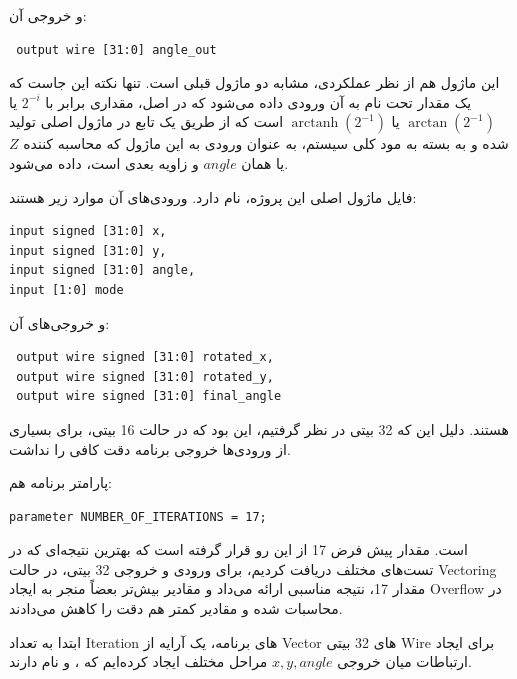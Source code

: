 \documentclass[12pt,titlepage,a4page , tikz , multi,table , svgnames,xcdraw]{article}
\DeclareMathOperator\arctanh{arctanh}
\begin{document}
و خروجی آن:

\begin{latin}
\begin{verbatim}
 output wire [31:0] angle_out
\end{verbatim}
\end{latin}

این ماژول هم از نظر عملکردی، مشابه دو ماژول قبلی است. تنها نکته این جاست که یک مقدار تحت نام  به آن ورودی داده می‌شود که در اصل، مقداری برابر با $2^{-i}$ یا $\arctan (2^{-1})$ یا
$\arctanh (2^{-1})$
است که از طریق یک تابع در ماژول اصلی تولید شده و به بسته به مود کلی سیستم، به عنوان ورودی به این ماژول که محاسبه کننده $Z$ یا همان $angle$ و زاویه بعدی است، داده می‌شود.

\hrulefill

فایل ماژول اصلی این پروژه،  نام دارد. ورودی‌های آن موارد زیر هستند:

\begin{latin}
\begin{verbatim}
input signed [31:0] x,
input signed [31:0] y,
input signed [31:0] angle,
input [1:0] mode
\end{verbatim}
\end{latin}

و خروجی‌های آن:

\begin{latin}
\begin{verbatim}
 output wire signed [31:0] rotated_x,
 output wire signed [31:0] rotated_y,
 output wire signed [31:0] final_angle
\end{verbatim}
\end{latin}

هستند. دلیل این که 32 بیتی در نظر گرفتیم، این بود که در حالت 16 بیتی، برای بسیاری از ورودی‌ها خروجی برنامه دقت کافی را نداشت.

پارامتر برنامه هم:

\begin{latin}
\begin{verbatim}
parameter NUMBER_OF_ITERATIONS = 17;
\end{verbatim}
\end{latin}

است. مقدار پیش فرض 17 از این رو قرار گرفته است که بهترین نتیجه‌ای که در تست‌های مختلف دریافت کردیم، برای ورودی و خروجی 32 بیتی، در حالت Vectoring مقدار 17، نتیجه مناسبی ارائه می‌داد و مقادیر بیش‌تر بعضاً منجر به ایجاد Overflow در محاسبات شده و مقادیر کمتر هم دقت را کاهش می‌دادند.


ابتدا به تعداد Iteration های برنامه، یک آرایه از Vector های 32 بیتی Wire برای ایجاد ارتباطات میان خروجی $x,y,angle$ مراحل مختلف ایجاد کرده‌ایم که ،  و  نام دارند.
\end{document}
